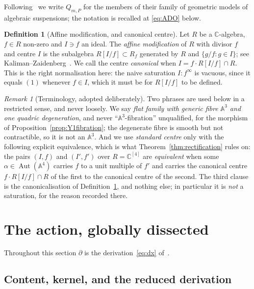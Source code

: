 \documentclass[11pt]{article}
\theoremstyle{definition}
\newtheorem{definition}[theorem]{Definition}
\theoremstyle{remark}
\newtheorem{remark}[theorem]{Remark}
\newcommand{\C}{\mathbb{C}}
\newcommand{\Aff}[1]{\mathbb{A}^{#1}}
\newcommand{\Aut}{\operatorname{Aut}}
\begin{document}
Following~\cite{ADO2021} we write $Q_{m,P}$ for the members of their family of
geometric models of algebraic suspensions; the notation is recalled at
\eqref{eq:ADO} below.

\begin{definition}[Affine modification, and canonical centre]\label{def:mod}
Let $R$ be a $\C$-algebra, $f\in R$ non-zero and $I\ni f$ an ideal. The
\emph{affine modification} of $R$ with divisor $f$ and centre $I$ is the
subalgebra $R[I/f]\subset R_f$ generated by $R$ and $\{g/f: g\in I\}$; see
Kaliman--Zaidenberg~\cite{KZ1998}. We call the centre \emph{canonical} when
$I=f\cdot R[I/f]\cap R$. This is the right normalisation here: the naive
saturation $I:f^\infty$ is vacuous, since it equals $(1)$ whenever $f\in I$,
which it must be for $R[I/f]$ to be defined.
\end{definition}

\begin{remark}[Terminology, adopted deliberately]\label{rem:terminology}
Two phrases are used below in a restricted sense, and never loosely. We say
\emph{flat family with generic fibre $\Aff{3}$ and one quadric degeneration},
and never ``$\Aff{3}$-fibration'' unqualified, for the morphism of
Proposition~\ref{prop:Y1fibration}; the degenerate fibre is smooth but not
contractible, so it is not an $\Aff{3}$. And we use \emph{standard centre}
only with the following explicit equivalence, which is what
Theorem~\ref{thm:rectification} rules on: the pairs $(I,f)$ and $(I',f')$ over
$R=\C^{[4]}$ are \emph{equivalent} when some $\alpha\in\Aut(\Aff{4})$ carries
$f$ to a unit multiple of $f'$ and carries the canonical centre
$f\cdot R[I/f]\cap R$ of the first to the canonical centre of the second. The
third clause is the canonicalisation of Definition~\ref{def:mod}, and nothing
else; in particular it is \emph{not} a saturation, for the reason recorded
there.
\end{remark}

\section{The action, globally dissected}\label{sec:action}

Throughout this section $\partial$ is the derivation~\eqref{eq:dx}
of~\cite{DMJP2009}.

\subsection{Content, kernel, and the reduced derivation}
\end{document}
